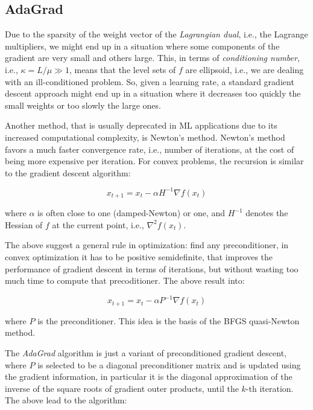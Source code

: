 \pagebreak

\subsection{AdaGrad}

Due to the sparsity of the weight vector of the \emph{Lagrangian dual}, i.e., the Lagrange multipliers, we might end up in a situation where some components of the gradient are very small and others large. This, in terms of \emph{conditioning number}, i.e., $\kappa = L/\mu \gg 1$, means that the level sets of $f$ are ellipsoid, i.e., we are dealing with an ill-conditioned problem. So, given a learning rate, a standard gradient descent approach might end up in a situation where it decreases too quickly the small weights or too slowly the large ones.

Another method, that is usually deprecated in ML applications due to its increased computational complexity, is Newton’s method. Newton’s method favors a much faster convergence rate, i.e., number of iterations, at the cost of being more expensive per iteration. For convex problems, the recursion is similar to the gradient descent algorithm:

$$
x_{t+1} = x_t - \alpha H^{-1} \nabla f(x_t)
$$

where $\alpha$ is often close to one (damped-Newton) or one, and $H^{-1}$ denotes the Hessian of $f$ at the current point, i.e., $\nabla^2 f(x_t)$.

The above suggest a general rule in optimization: find any preconditioner, in convex optimization it has to be positive semidefinite, that improves the performance of gradient descent in terms of iterations, but without wasting too much time to compute that precoditioner. The above result into:

$$
x_{t+1} = x_t - \alpha P^{-1} \nabla f(x_t)
$$

where $P$ is the preconditioner. This idea is the basis of the BFGS quasi-Newton method.

The \emph{AdaGrad} \cite{duchi2011adaptive} algorithm is just a variant of preconditioned gradient descent, where $P$ is selected to be a diagonal preconditioner matrix and is updated using the gradient information, in particular it is the diagonal approximation of the inverse of the square roots of gradient outer products, until the $k$-th iteration. The above lead to the algorithm:

